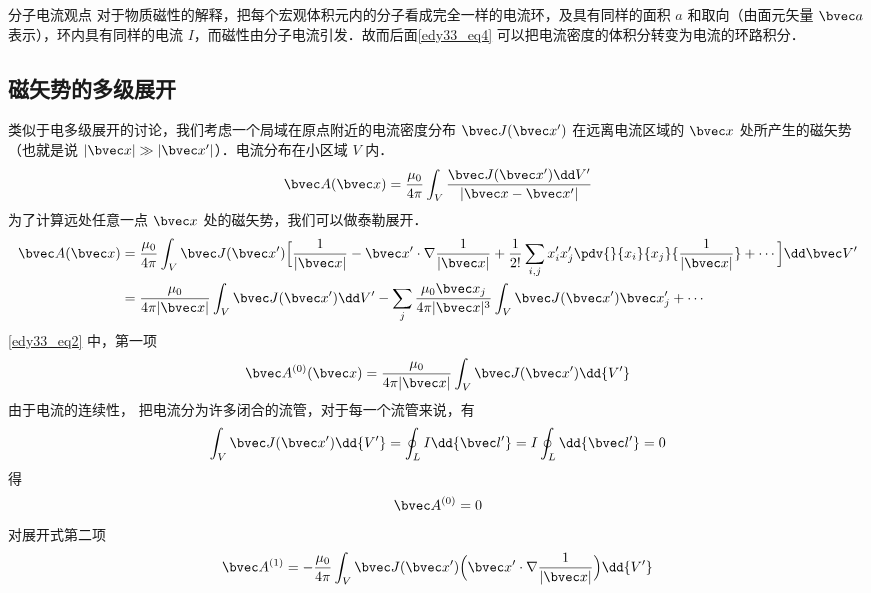 
\begin{lemma}{分子电流观点}
对于物质磁性的解释，把每个宏观体积元内的分子看成完全一样的电流环，及具有同样的面积 $a$ 和取向（由面元矢量 $\bvec a$ 表示），环内具有同样的电流 $I$，而磁性由分子电流引发．故而后面\autoref{edy33_eq4} 可以把电流密度的体积分转变为电流的环路积分．
\end{lemma}
\subsection{磁矢势的多级展开}
类似于电多级展开的讨论，我们考虑一个局域在原点附近的电流密度分布 $\bvec J(\bvec x')$ 在远离电流区域的 $\bvec x$ 处所产生的磁矢势（也就是说 $|\bvec x|\gg|\bvec x'|$）．电流分布在小区域 $V$ 内．
\begin{equation}
\bvec A(\bvec x)=\dfrac {\mu_0}{4\pi} \int_V \dfrac{ \bvec J(\bvec x^{\prime})\dd V^{\prime}}{|\bvec x - \bvec x'|}\label{edy33_eq1}
\end{equation}
为了计算远处任意一点 $\bvec x$ 处的磁矢势，我们可以做泰勒展开．
\begin{align}
\bvec A(\bvec x)&=\dfrac {\mu_0}{4\pi}\int_V \bvec J(\bvec x')\Big[\dfrac{1}{|\bvec x|}-\bvec x'\cdot\nabla \dfrac{1}{|\bvec x|}+\dfrac{1}{2!}\sum_{i,j}x_i^{\prime}x_j^{\prime}\pdv{}{x_i}{x_j}{\dfrac 1 {|\bvec x|}}+\cdots\Big]\dd \bvec V^{\prime}
\label{edy33_eq2_0}
\\
&=\dfrac{\mu_0}{4\pi|\bvec x|}\int_V \bvec J(\bvec x')\dd V'
-\sum_{j}\dfrac{\mu_0 \bvec x_j}{4\pi |\bvec x|^3}\int_V \bvec J(\bvec x')\bvec x'_j + \cdots
\label{edy33_eq2}
\end{align}
\autoref{edy33_eq2} 中，第一项
\begin{equation}
\bvec A^{(0)}(\bvec x)=\dfrac {\mu_0}{4\pi |\bvec x|}\int_V \bvec J(\bvec x')\dd{ V^{\prime}}\label{edy33_eq3}
\end{equation}
由于电流的连续性，%
把电流分为许多闭合的流管，对于每一个流管来说，有
\begin{equation}
\int_V \bvec J(\bvec x^{\prime}) \dd{V^{\prime}}=\oint_L I\dd{\bvec l'}=I\oint_L \dd{\bvec l'}=0\label{edy33_eq4}
\end{equation}
得\begin{equation}
\bvec A^{(0)}=0\label{edy33_eq5}
\end{equation}
对展开式第二项
\begin{equation}
\bvec A^{(1)}=-\dfrac{\mu_0 }{4\pi}\int_V \bvec J(\bvec x^{\prime})\Big (\bvec x^{\prime}\cdot\nabla\dfrac{1}{|\bvec x|}\Big)\dd{V^{\prime}}\label{edy33_eq6}
\end{equation}
